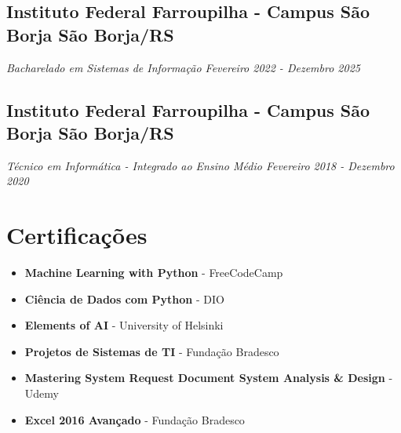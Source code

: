 \documentclass[a4paper,10pt]{article}
\begin{document}
    \subsection*{\texorpdfstring{
            \textbf{Instituto Federal Farroupilha - Campus São Borja} \hfill São Borja/RS}{Instituto Federal Farroupilha - Campus São Borja -- São Borja}}
    \textit{Bacharelado em Sistemas de Informação \hfill Fevereiro 2022 - Dezembro 2025}

    \subsection*{\texorpdfstring{
            \textbf{Instituto Federal Farroupilha - Campus São Borja} \hfill São Borja/RS
        }{
            Instituto Federal Farroupilha - Campus São Borja -- São Borja
        }}
    \textit{Técnico em Informática - Integrado ao Ensino Médio \hfill Fevereiro 2018 - Dezembro 2020}


\section{Certificações}
    \begin{itemize}
        \item \textbf{Machine Learning with Python} - FreeCodeCamp
        \item \textbf{Ciência de Dados com Python} - DIO
        \item \textbf{Elements of AI} - University of Helsinki
        \item \textbf{Projetos de Sistemas de TI} - Fundação Bradesco
        \item \textbf{Mastering System Request Document System Analysis \& Design} - Udemy
        \item \textbf{Excel 2016 Avançado} - Fundação Bradesco
    \end{itemize}
\end{document}
